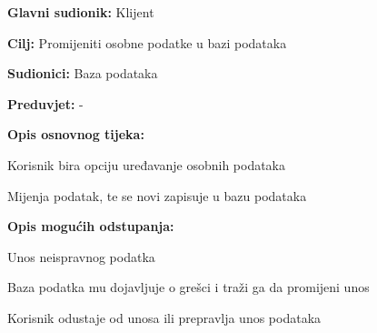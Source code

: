 					\noindent {}
					\begin{packed_item}
	
						\item \textbf{Glavni sudionik: }Klijent
						\item  \textbf{Cilj:} Promijeniti osobne podatke u bazi podataka
						\item  \textbf{Sudionici:} Baza podataka
						\item  \textbf{Preduvjet:} -
						\item  \textbf{Opis osnovnog tijeka:}
						
						\item[] \begin{packed_enum}
	
							\item Korisnik bira opciju uređavanje osobnih podataka
							\item Mijenja podatak, te se novi zapisuje u bazu podataka

						\end{packed_enum}
						\item  \textbf{Opis mogućih odstupanja:}
						
						\item[] \begin{packed_item}
	
							\item[2.a] Unos neispravnog podatka
							\item[] \begin{packed_enum}
								
								\item Baza podatka mu dojavljuje o grešci i traži ga da promijeni unos	
								\item Korisnik odustaje od unosa ili prepravlja unos podataka
							\end{packed_enum}
						\end{packed_item}
						
					\end{packed_item}
					

